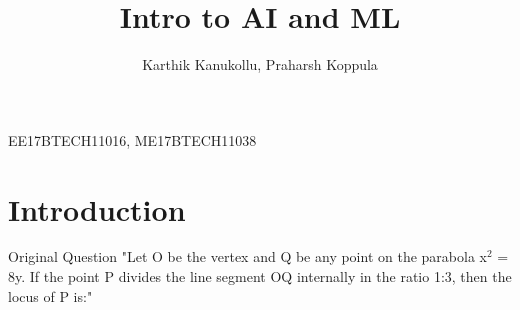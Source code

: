 \documentclass{beamer}
\title[Intro to AI and ML]{Intro to AI and ML}
\author{Karthik Kanukollu, Praharsh Koppula}
\begin{document}
\begin{frame}
  \titlepage
  \begin{center}
      
  EE17BTECH11016, ME17BTECH11038
  \end{center}
\end{frame}

\section{Introduction}

\begin{frame}{Original Question}
    "Let O be the vertex and Q be any point on the parabola x$^2$ = 8y. If the point P divides the line segment OQ internally in the ratio 1:3, then the locus of P is:"
\end{frame}
\end{document}
